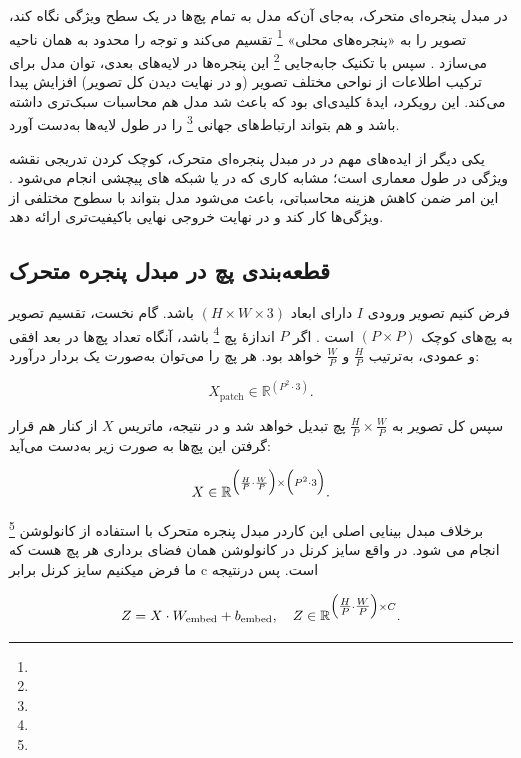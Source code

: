 در مبدل پنجره‌ای متحرک، به‌جای آن‌که مدل به تمام پچ‌ها در یک سطح ویژگی نگاه کند، تصویر را به «پنجره‌های محلی» \footnote{} تقسیم می‌کند و توجه را محدود به همان ناحیه می‌سازد \cite{liu2021swintransformer}. سپس با تکنیک جابه‌جایی \footnote{} این پنجره‌ها در لایه‌های بعدی، توان مدل برای ترکیب اطلاعات از نواحی مختلف تصویر (و در نهایت دیدن کل تصویر) افزایش پیدا می‌کند. این رویکرد، ایدهٔ کلیدی‌ای بود که باعث شد مدل هم محاسبات سبک‌تری داشته باشد و هم بتواند ارتباط‌های جهانی \footnote{} را در طول لایه‌ها به‌دست آورد.



یکی دیگر از ایده‌های مهم در در مبدل پنجره‌ای متحرک، کوچک‌ کردن تدریجی نقشه ویژگی  در طول معماری است؛ مشابه کاری که در  یا شبکه های پیچشی انجام می‌شود \cite{he2016deep}. این امر ضمن کاهش هزینه محاسباتی، باعث می‌شود مدل بتواند با سطوح مختلفی از ویژگی‌ها کار کند و در نهایت خروجی نهایی باکیفیت‌تری ارائه دهد.

\subsection{قطعه‌بندی پچ در مبدل پنجره متحرک}
فرض کنیم تصویر ورودی \(\displaystyle I\) دارای ابعاد \(\displaystyle (H \times W \times 3)\) باشد. گام نخست، تقسیم تصویر به پچ‌های کوچک \(\displaystyle (P \times P)\) است \cite{dosovitskiy2020image}. اگر \(P\) اندازهٔ پچ \footnote{} باشد، آنگاه تعداد پچ‌ها در بعد افقی و عمودی، به‌ترتیب \(\displaystyle \frac{H}{P}\) و \(\displaystyle \frac{W}{P}\) خواهد بود. هر پچ را می‌توان به‌صورت یک بردار درآورد:

\[
X_{\text{patch}} \in \mathbb{R}^{(P^2 \cdot 3)}.
\]

سپس کل تصویر به \(\displaystyle \frac{H}{P} \times \frac{W}{P}\) پچ تبدیل خواهد شد و در نتیجه، ماتریس \(\displaystyle X\) از کنار هم قرار گرفتن این پچ‌ها به صورت زیر به‌دست می‌آید:

\[
X \in \mathbb{R}^{\Bigl(\frac{H}{P} \cdot \frac{W}{P}\Bigr) \times \Bigl(P^2 \cdot 3\Bigr)}.
\]

برخلاف مبدل بینایی اصلی این کاردر مبدل پنجره متحرک با استفاده از کانولوشن \footnote{} انجام می شود.
در واقع سایز کرنل در کانولوشن همان فضای برداری هر پچ هست که ما فرض میکنیم سایز کرنل برابر c ‌است. پس درنتیجه



\begin{equation}
	Z = X \cdot W_{\text{embed}} + b_{\text{embed}}, 
	\quad
	Z \in \mathbb{R}^{\Bigl(\tfrac{H}{P} \cdot \tfrac{W}{P}\Bigr) \times C}.
\end{equation}

